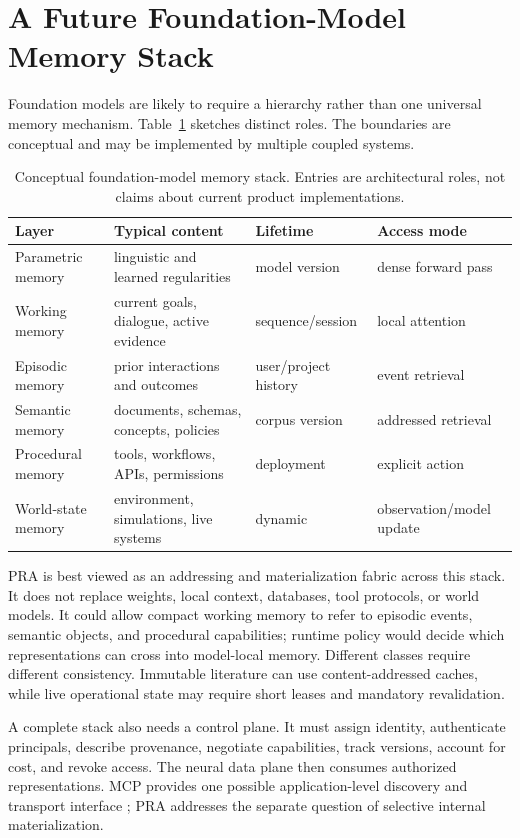 \documentclass[11pt]{article}
\begin{document}
\section{A Future Foundation-Model Memory Stack}

Foundation models are likely to require a hierarchy rather than one universal memory mechanism. Table~\ref{tab:memory-stack} sketches distinct roles. The boundaries are conceptual and may be implemented by multiple coupled systems.

\begin{table}[t]
\centering
\caption{Conceptual foundation-model memory stack. Entries are architectural roles, not claims about current product implementations.}
\label{tab:memory-stack}
\begin{tabularx}{\linewidth}{@{}lXXX@{}}
\toprule
Layer & Typical content & Lifetime & Access mode \\
\midrule
Parametric memory & linguistic and learned regularities & model version & dense forward pass \\
Working memory & current goals, dialogue, active evidence & sequence/session & local attention \\
Episodic memory & prior interactions and outcomes & user/project history & event retrieval \\
Semantic memory & documents, schemas, concepts, policies & corpus version & addressed retrieval \\
Procedural memory & tools, workflows, APIs, permissions & deployment & explicit action \\
World-state memory & environment, simulations, live systems & dynamic & observation/model update \\
\bottomrule
\end{tabularx}
\end{table}

PRA is best viewed as an addressing and materialization fabric across this stack. It does not replace weights, local context, databases, tool protocols, or world models. It could allow compact working memory to refer to episodic events, semantic objects, and procedural capabilities; runtime policy would decide which representations can cross into model-local memory. Different classes require different consistency. Immutable literature can use content-addressed caches, while live operational state may require short leases and mandatory revalidation.

A complete stack also needs a control plane. It must assign identity, authenticate principals, describe provenance, negotiate capabilities, track versions, account for cost, and revoke access. The neural data plane then consumes authorized representations. MCP provides one possible application-level discovery and transport interface \cite{mcp2025spec}; PRA addresses the separate question of selective internal materialization.
\end{document}
